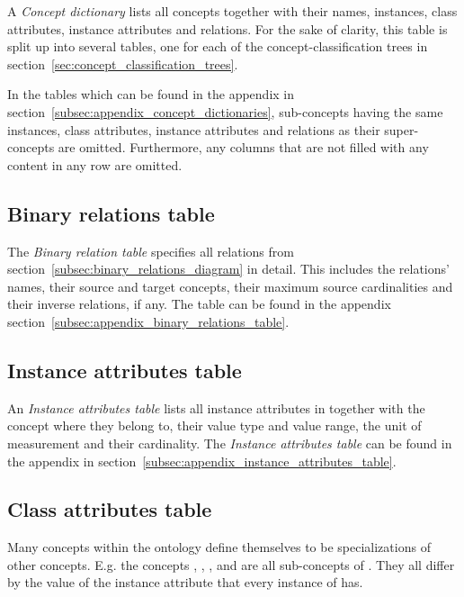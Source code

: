 A \emph{Concept dictionary} lists all concepts together with their names, instances, class attributes, instance attributes and relations. For the sake of clarity, this table is split up into several tables, one for each of the concept-classification trees in section~\ref{sec:concept_classification_trees}.

In the tables which can be found in the appendix in section~\ref{subsec:appendix_concept_dictionaries}, sub-concepts having the same instances, class attributes, instance attributes and relations as their super-concepts are omitted. Furthermore, any columns that are not filled with any content in any row are omitted.

\subsection{Binary relations table}
\label{subsec:binary_relations_table}

The \emph{Binary relation table} specifies all relations from section~\ref{subsec:binary_relations_diagram} in detail. This includes the relations' names, their source and target concepts, their maximum source cardinalities and their inverse relations, if any. The table can be found in the appendix section~\ref{subsec:appendix_binary_relations_table}.

\subsection{Instance attributes table}
\label{subsec:instance_attributes_table}

An \emph{Instance attributes table} lists all instance attributes in \thinkhomeweather together with the concept where they belong to, their value type and value range, the unit of measurement and their cardinality. The \emph{Instance attributes table} can be found in the appendix in section~\ref{subsec:appendix_instance_attributes_table}.

\subsection{Class attributes table}
\label{subsec:class_attributes_table}

Many concepts within the \thinkhomeweather ontology define themselves to be specializations of other concepts. E.g. the concepts , , ,  and  are all sub-concepts of . They all differ by the value of the instance attribute  that every instance of  has.

